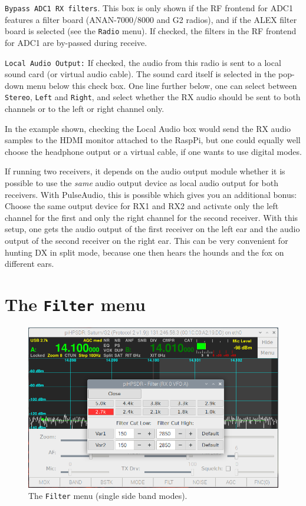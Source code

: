 \documentclass[12pt]{book}
\def\rett#1{\texttt{\color{red}#1}}
\def\bltt#1{\texttt{\color{blue}#1}}
\begin{document}
\rett{Bypass ADC1 RX filters}. This box is only shown if the RF frontend for ADC1
features a filter board (ANAN-7000/8000 and G2 radios),
and if the ALEX filter board
is selected (see the \bltt{Radio} menu). If checked, the filters in the RF frontend for ADC1
are by-passed during receive.

\rett{Local Audio Output:} If checked, the audio from this radio is sent to a local
sound card (or virtual audio cable). The sound card itself is selected in the
pop-down menu below this check box. One line further below, one can select between
\texttt{Stereo}, \texttt{Left} and \texttt{Right}, and select whether the RX
audio should be sent to both channels or to the left or right channel only.

In the example shown, checking the Local Audio box would send the RX audio
samples to the HDMI monitor attached to the RaspPi, but one could equally
well choose the headphone output or a virtual cable, if one wants to use
digital modes.

If running two receivers, it depends on the audio output module whether
it is possible to use the \textit{same} audio output device as local audio output
for both receivers. With PulseAudio, this is possible which gives you an additional
bonus:
Choose the same output device for RX1 and RX2 and activate only
the left channel for the first and only the right channel for the second receiver.
With this setup,
one gets the audio output of the first receiver on the left ear and the audio output of
the second receiver on the right ear. This can be very convenient for hunting DX in split mode,
because one then hears the hounds and the fox on different ears.

\section{The \texttt{Filter} menu}

\begin{figure}[ht]
\center
\includegraphics[width=12cm]{FilterMenuUSB.png}
\caption{The \bltt{Filter} menu (single side band modes).}
\label{fig:FilterMenuUSB}
\end{figure}
\end{document}
